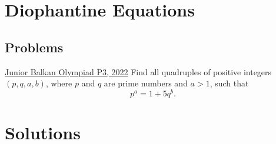 \section{Diophantine Equations}
\subsection{Problems}
\begin{problem}{1}{\href{https://artofproblemsolving.com/community/q3h2874609p34343404}{Junior Balkan Olympiad P3, 2022}}
	Find all quadruples of positive integers $(p, q, a, b)$, where $p$ and $q$ are prime numbers and $a > 1$, such that$$p^a = 1 + 5q^b.$$
\end{problem}


\newpage
\section{Solutions}
